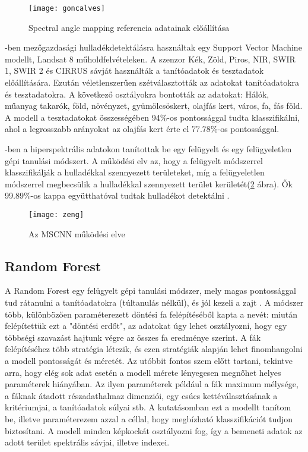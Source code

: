 \begin{figure}[H]
	\centering
	\texttt{[image: goncalves]}
	\caption{Spectral angle mapping referencia adatainak előállítása \cite{goncalves2022}}
    \label{fig:goncalves}
\end{figure}

\cite{lanorte2017}-ben mezőgazdasági hulladékdetektálásra használtak egy Support Vector Machine modellt, Landsat 8 műholdfelvételeken. A szenzor Kék, Zöld, Piros, NIR, SWIR 1, SWIR 2 és CIRRUS sávját használták a tanítóadatok és tesztadatok előállítására. Ezután véletlenszerűen szétválasztották az adatokat tanítóadatokra és tesztadatokra. A következő osztályokra bontották az adatokat: Hálók, műanyag takarók, föld, növényzet, gyümölcsöskert, olajfás kert, város, fa, fás föld. A modell a tesztadatokat összességében 94\%-os pontossággal tudta klasszifikálni, ahol a legrosszabb arányokat az olajfás kert érte el 77.78\%-os pontossággal.

\cite{zeng2019}-ben a hiperspektrális adatokon tanítottak be egy felügyelt és egy felügyeletlen gépi tanulási módszert. A működési elv az, hogy a felügyelt módszerrel klasszifikálják a hulladékkal szennyezett területeket, míg a felügyeletlen módszerrel megbecsülik a hulladékkal szennyezett terület kerületét(\ref{fig:zeng} ábra). Ők 99.89\%-os kappa együtthatóval tudtak hulladékot detektálni .

\begin{figure}[H]
	\centering
	\texttt{[image: zeng]}
	\caption{Az MSCNN működési elve \cite{zeng2019}}
    \label{fig:zeng}
\end{figure}

\subsection{Random Forest}

A Random Forest egy felügyelt gépi tanulási módszer, mely magas pontossággal tud rátanulni a tanítóadatokra (túltanulás nélkül), és jól kezeli a zajt \cite{breiman2001}. A módszer több, különbözően paraméterezett döntési fa felépítéséből kapta a nevét: miután felépítettük ezt a "döntési erdőt", az adatokat úgy lehet osztályozni, hogy egy többségi szavazást hajtunk végre az összes fa eredménye szerint. A fák felépítéséhez több stratégia létezik, és ezen stratégiák alapján lehet finomhangolni a modell pontosságát és méretét. Az utóbbit fontos szem előtt tartani, tekintve arra, hogy elég sok adat esetén a modell mérete lényegesen megnőhet helyes paraméterek hiányában. Az ilyen paraméterek például a fák maximum mélysége, a fáknak átadott részadathalmaz dimenziói, egy csúcs kettéválasztásának a kritériumjai, a tanítóadatok súlyai stb. A kutatásomban ezt a modellt tanítom be, illetve paraméterezem azzal a céllal, hogy megbízható klasszifikációt tudjon biztosítani. A modell minden képkockát osztályozni fog, így a bemeneti adatok az adott terület spektrális sávjai, illetve indexei. 
